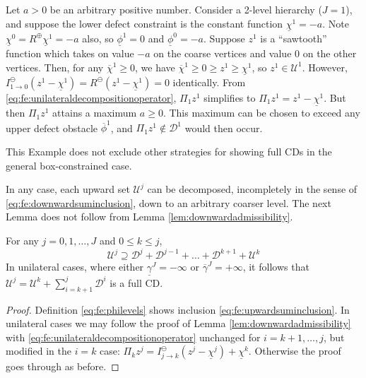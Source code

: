 \documentclass[review,hidelinks,onefignum,onetabnum,final]{siamart220329}  %
\newcommand{\maxR}{R^{\bm{\oplus}}}
\newcommand{\minR}{R^{\bm{\ominus}}}
\begin{document}
\begin{example}  \label{ex:notfullcd}
Let $a > 0$ be an arbitrary positive number.  Consider a 2-level hierarchy ($J=1$), and suppose the lower defect constraint is the constant function $\underline{\chi}^1=-a$.  Note $\underline{\chi}^0=\maxR \underline{\chi}^1=-a$ also, so $\underline{\phi}^1=0$ and $\underline{\phi}^0=-a$.  Suppose $z^1$ is a ``sawtooth'' function which takes on value $-a$ on the coarse vertices and value $0$ on the other vertices.  Then, for any $\overline{\chi}^1\ge 0$, we have $\overline{\chi}^1 \ge 0 \ge z^1\ge \underline{\chi}^1$, so $z^1 \in \mathcal{U}^1$.  However, $I_{1\to 0}^\ominus(z^1 - \underline{\chi}^1) = \minR(z^1 - \underline{\chi}^1) = 0$ identically.  From \eqref{eq:fe:unilateraldecompositionoperator}, $\Pi_1 z^1$ simplifies to $\Pi_1 z^1 = z^1 - \underline{\chi}^1$.  But then $\Pi_1 z^1$ attains a maximum $a\ge 0$.  This maximum can be chosen to exceed any upper defect obstacle $\overline{\phi}^1$, and $\Pi_1 z^1 \notin \mathcal{D}^1$ would then occur.
\end{example}

This Example does not exclude other strategies for showing full CDs in the general box-constrained case.

In any case, each upward set $\mathcal{U}^j$ can be decomposed, incompletely in the sense of \eqref{eq:fe:downwardsuminclusion}, down to an arbitrary coarser level.  The next Lemma does not follow from Lemma \ref{lem:downwardadmissibility}.

\begin{lemma}  \label{lem:upwardadmissibility}  For any $j=0,1,\dots,J$ and $0\le k\le j$,
\begin{equation}
\mathcal{U}^j \supseteq \mathcal{D}^j + \mathcal{D}^{j-1} + \dots + \mathcal{D}^{k+1} + \mathcal{U}^k \label{eq:fe:upwardsuminclusion}
\end{equation}
In unilateral cases, where either $\underline{\gamma}^J=-\infty$ or $\overline{\gamma}^J=+\infty$, it follows that $\mathcal{U}^j = \mathcal{U}^k + \sum_{i=k+1}^j \mathcal{D}^i$ is a full CD. \end{lemma}

\begin{proof}  Definition \eqref{eq:fe:philevels} shows inclusion \eqref{eq:fe:upwardsuminclusion}.  In unilateral cases we may follow the proof of Lemma \ref{lem:downwardadmissibility} with \eqref{eq:fe:unilateraldecompositionoperator} unchanged for $i=k+1,\dots,j$, but modified in the $i=k$ case: $\Pi_k z^j = I_{j\to k}^\ominus(z^j - \underline{\chi}^j) + \underline{\chi}^k$.  Otherwise the proof goes through as before.
\end{proof}
\end{document}
